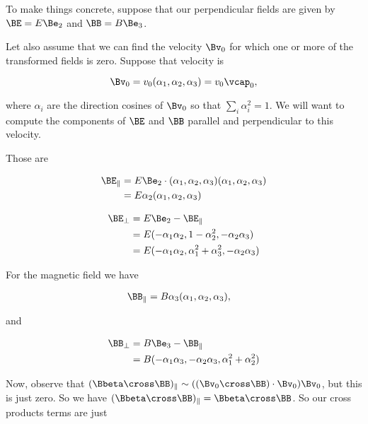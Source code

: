 To make things concrete, suppose that our perpendicular fields are given by $\BE = E \Be_2$ and $\BB = B \Be_3$.

Let also assume that we can find the velocity $\Bv_0$ for which one or more of the transformed fields is zero.  Suppose that velocity is

\begin{equation}\label{eqn:relElectroDynProblemSet3:1480}
\Bv_0 = v_0 (\alpha_1, \alpha_2, \alpha_3) = v_0 \vcap_0,
\end{equation}

where $\alpha_i$ are the direction cosines of $\Bv_0$ so that $\sum_i \alpha_i^2 = 1$.  We will want to compute the components of $\BE$ and $\BB$ parallel and perpendicular to this velocity.

Those are

\begin{align*}
\BE_\parallel 
&= E \Be_2 \cdot (\alpha_1, \alpha_2, \alpha_3) (\alpha_1, \alpha_2, \alpha_3) \\
&= E \alpha_2 (\alpha_1, \alpha_2, \alpha_3) \\
\end{align*}

\begin{align*}
\BE_\perp 
&= E \Be_2 - \BE_\parallel \\
&= E (-\alpha_1 \alpha_2, 1 - \alpha_2^2, -\alpha_2 \alpha_3) \\
&= E (-\alpha_1 \alpha_2, \alpha_1^2 + \alpha_3^2, -\alpha_2 \alpha_3) \\
\end{align*}

For the magnetic field we have

\begin{align*}
\BB_\parallel 
&= B \alpha_3 (\alpha_1, \alpha_2, \alpha_3),
\end{align*}

and

\begin{align*}
\BB_\perp 
&= B \Be_3 - \BB_\parallel \\
&= B (-\alpha_1 \alpha_3, -\alpha_2 \alpha_3, \alpha_1^2 + \alpha_2^2)  \\
\end{align*}

Now, observe that $(\Bbeta \cross \BB)_\parallel \sim ((\Bv_0 \cross \BB) \cdot \Bv_0) \Bv_0$, but this is just zero.  So we have $(\Bbeta \cross \BB)_\parallel = \Bbeta \cross \BB$.  So our cross products terms are just


